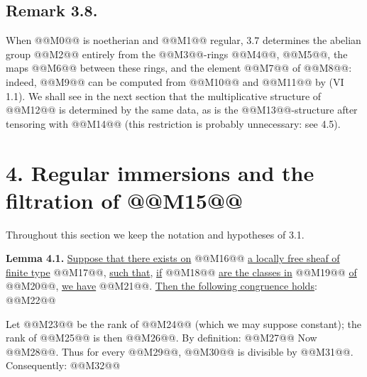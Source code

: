 \subsection*{Remark 3.8.}

When @@M0@@ is noetherian and @@M1@@ regular, 3.7 determines the abelian group @@M2@@ entirely from the @@M3@@-rings @@M4@@, @@M5@@, the maps @@M6@@ between these rings, and the element @@M7@@ of @@M8@@: indeed, @@M9@@ can be computed from @@M10@@ and @@M11@@ by (VI 1.1). We shall see in the next section that the multiplicative structure of @@M12@@ is determined by the same data, as is the @@M13@@-structure after tensoring with @@M14@@ (this restriction is probably unnecessary: see 4.5).

\section*{4. Regular immersions and the filtration of @@M15@@}

Throughout this section we keep the notation and hypotheses of 3.1.

\textbf{Lemma 4.1.} \uline{Suppose that there exists on} @@M16@@ \uline{a locally free sheaf of finite type} @@M17@@, \uline{such that}, \uline{if} @@M18@@ \uline{are the classes in} @@M19@@ \uline{of} @@M20@@, \uline{we have} @@M21@@. \uline{Then the following congruence holds}:
@@M22@@

Let @@M23@@ be the rank of @@M24@@ (which we may suppose constant); the rank of @@M25@@ is then @@M26@@. By definition:
@@M27@@
Now @@M28@@. Thus for every @@M29@@, @@M30@@ is divisible by @@M31@@. Consequently:
@@M32@@
